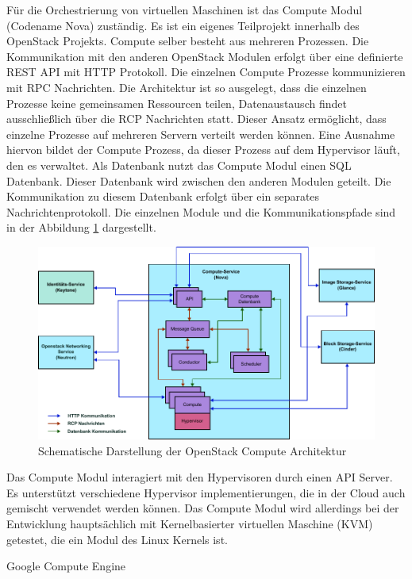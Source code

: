 Für die Orchestrierung von virtuellen Maschinen ist das Compute Modul (Codename Nova) zuständig. Es ist ein eigenes Teilprojekt innerhalb des OpenStack Projekts. Compute selber besteht aus mehreren Prozessen. Die Kommunikation mit den anderen OpenStack Modulen erfolgt über eine definierte REST API mit HTTP Protokoll. Die einzelnen Compute Prozesse kommunizieren mit RPC Nachrichten. Die Architektur ist so ausgelegt, dass die einzelnen Prozesse keine gemeinsamen Ressourcen teilen, Datenaustausch findet ausschließlich über die RCP Nachrichten statt. Dieser Ansatz ermöglicht, dass einzelne Prozesse auf mehreren Servern verteilt werden können. Eine Ausnahme hiervon bildet der Compute Prozess, da dieser Prozess auf dem Hypervisor läuft, den es verwaltet. Als Datenbank nutzt das Compute Modul einen SQL Datenbank. Dieser Datenbank wird zwischen den anderen Modulen geteilt. Die Kommunikation zu diesem Datenbank erfolgt über ein separates Nachrichtenprotokoll. Die einzelnen Module und die Kommunikationspfade sind in der Abbildung \ref{compute_arch} dargestellt. 

\begin{figure}[htbp]
	\centering
	\includegraphics[width=\textwidth]{./content/graphics/compute_arch.pdf}
	\caption{Schematische Darstellung der OpenStack Compute Architektur}
	\label{compute_arch}
\end{figure}

Das Compute Modul interagiert mit den Hypervisoren durch einen API Server. Es unterstützt verschiedene Hypervisor implementierungen, die in der Cloud auch gemischt verwendet werden können. Das Compute Modul wird allerdings bei der Entwicklung hauptsächlich mit Kernelbasierter virtuellen Maschine (KVM) getestet, die ein Modul des Linux Kernels ist. 

Google Compute Engine

